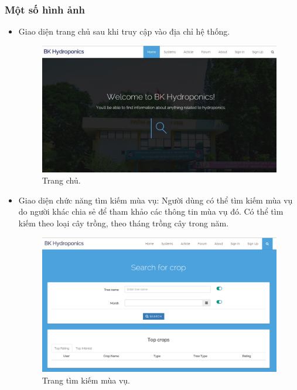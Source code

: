 \documentclass[a4paper,12pt,oneside]{article}
\begin{document}
\subsubsection{Một số hình ảnh}
\begin{itemize}
\item Giao diện trang chủ sau khi truy cập vào địa chỉ hệ thống.
\begin{figure}[H]
\centering
\includegraphics[scale=.45]{hinh/web_home.jpg}
\caption{Trang chủ.}
\end{figure}

\item Giao diện chức năng tìm kiếm mùa vụ: Người dùng có thể tìm kiếm mùa vụ do người khác chia sẻ để tham khảo các thông tin mùa vụ đó. Có thể tìm kiếm theo loại cây trồng, theo tháng trồng cây trong năm. 
\begin{figure}[H]
\centering
\includegraphics[scale=.45]{hinh/search_page.png}
\caption{Trang tìm kiếm mùa vụ.}
\end{figure}


\end{itemize}
\end{document}

